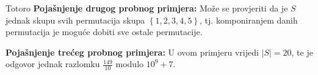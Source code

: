 \begin{statement}[
  problempoints=100,
  timelimit=1 sekunda,
  memorylimit=512 MiB,
]{Totoro}
\textbf{Pojašnjenje drugog probnog primjera:}
Može se provjeriti da je $S$ jednak skupu svih permutacija skupa 
$\left\{1, 2, 3, 4, 5 \right\}$, tj. komponiranjem danih permutacija
je moguće dobiti sve ostale permutacije.

\textbf{Pojašnjenje trećeg probnog primjera:}
U ovom primjeru vrijedi $|S| = 20$, te je odgovor jednak 
razlomku $\frac{149}{10}$ modulo $10^9 + 7$.

\end{statement}

